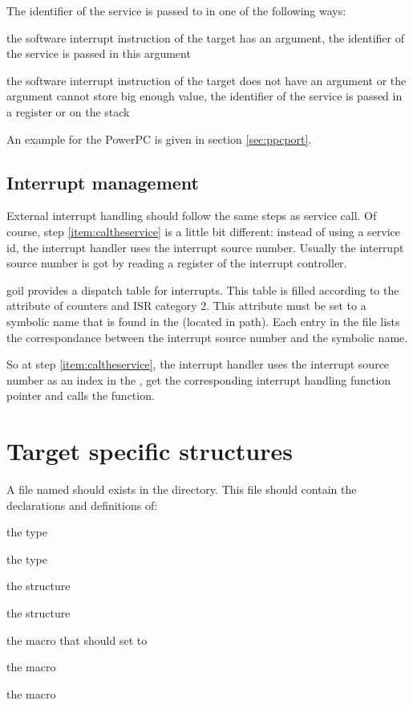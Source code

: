 The identifier of the service is passed to  in one of the following ways:
\begin{pitemize}
\item the software interrupt instruction of the target has an argument, the identifier of the service is passed in this argument
\item the software interrupt instruction of the target does not have an argument or the argument cannot store big enough value, the identifier of the service is passed in a register or on the stack
\end{pitemize}
 

An example for the PowerPC is given in section \ref{sec:ppcport}.

\subsection{Interrupt management}

External interrupt handling should follow the same steps as service call. Of course, step  \ref{item:caltheservice} is a little bit different: instead of using a service id, the interrupt handler uses the interrupt source number. Usually the interrupt source number is got by reading a register of the interrupt controller.

goil provides a dispatch table for interrupts. This table is filled according to the  attribute of counters and ISR category 2. This attribute must be set to a symbolic name that is found in the  (located in  path). Each entry in the  file lists the correspondance between the interrupt source number and the symbolic name.

So at step   \ref{item:caltheservice}, the interrupt handler uses the interrupt source number as an index in the , get the corresponding interrupt handling function pointer and calls the function.

\section{Target specific structures}

A file named  should exists in the  directory. This file should contain the declarations and definitions of:

\begin{pitemize}
\item the  type
\item the  type
\item the  structure
\item the  structure
\item the  macro that should set to 
\item the  macro
\item the  macro
\end{pitemize}

